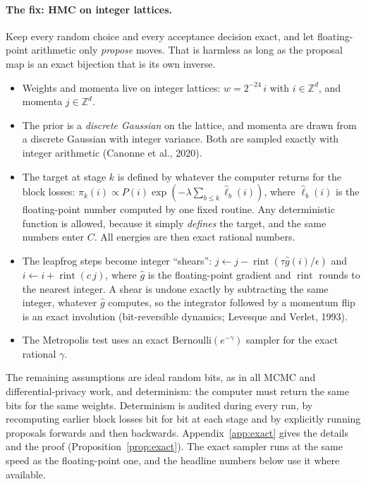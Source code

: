 \documentclass[11pt]{article}
\theoremstyle{definition}
\theoremstyle{remark}
\newcommand{\Z}{\mathbb{Z}}
\newcommand{\rint}{\operatorname{rint}}
\begin{document}
\paragraph{The fix: HMC on integer lattices.} Keep every random choice and every acceptance decision exact, and let
floating-point arithmetic only \emph{propose} moves. That is harmless as long as the proposal map is an exact bijection
that is its own inverse.
\begin{itemize}[nosep]
\item Weights and momenta live on integer lattices: $w=2^{-24}\,i$ with $i\in\Z^d$, and momenta $j\in\Z^d$.
\item The prior is a \emph{discrete Gaussian} on the lattice, and momenta are drawn from a discrete Gaussian with integer
  variance. Both are sampled exactly with integer arithmetic (Canonne et al., 2020).
\item The target at stage $k$ is defined by whatever the computer returns for the block losses:
  $\pi_k(i)\propto P(i)\exp(-\lambda\sum_{b\le k}\hat\ell_b(i))$, where $\hat\ell_b(i)$ is the floating-point number
  computed by one fixed routine. Any deterministic function is allowed, because it simply \emph{defines} the target, and
  the same numbers enter $C$. All energies are then exact rational numbers.
\item The leapfrog steps become integer ``shears'': $j\leftarrow j-\rint(\tau\hat g(i)/\epsilon)$ and
  $i\leftarrow i+\rint(c\,j)$, where $\hat g$ is the floating-point gradient and $\rint$ rounds to the nearest integer. A
  shear is undone exactly by subtracting the same integer, whatever $\hat g$ computes, so the integrator followed by a
  momentum flip is an exact involution (bit-reversible dynamics; Levesque and Verlet, 1993).
\item The Metropolis test uses an exact Bernoulli$(e^{-\gamma})$ sampler for the exact rational $\gamma$.
\end{itemize}
The remaining assumptions are ideal random bits, as in all MCMC and differential-privacy work, and determinism: the
computer must return the same bits for the same weights. Determinism is audited during every run, by recomputing earlier
block losses bit for bit at each stage and by explicitly running proposals forwards and then backwards.
Appendix~\ref{app:exact} gives the details and the proof (Proposition~\ref{prop:exact}). The exact sampler runs at the
same speed as the floating-point one, and the headline numbers below use it where available.

\end{document}
